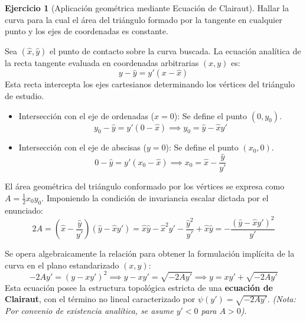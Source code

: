 \documentclass[11pt,a4paper]{article}
\theoremstyle{definition}
\newtheorem{exercise}{Ejercicio}[section]
\theoremstyle{plain}
\begin{document}
\begin{exercise}[Aplicación geométrica mediante Ecuación de Clairaut]
Hallar la curva para la cual el área del triángulo formado por la tangente en cualquier punto y los ejes de coordenadas es constante.
\end{exercise}

\begin{tcolorbox}
Sea $(\hat{x}, \hat{y})$ el punto de contacto sobre la curva buscada. La ecuación analítica de la recta tangente evaluada en coordenadas arbitrarias $(x,y)$ es:
$$ y - \hat{y} = y'(x - \hat{x}) $$
Esta recta intercepta los ejes cartesianos determinando los vértices del triángulo de estudio.
\begin{itemize}
    \item Intersección con el eje de ordenadas ($x=0$): Se define el punto $(0, y_0)$.
    $$ y_0 - \hat{y} = y'(0 - \hat{x}) \implies y_0 = \hat{y} - \hat{x}y' $$
    \item Intersección con el eje de abscisas ($y=0$): Se define el punto $(x_0, 0)$.
    $$ 0 - \hat{y} = y'(x_0 - \hat{x}) \implies x_0 = \hat{x} - \frac{\hat{y}}{y'} $$
\end{itemize}

El área geométrica del triángulo conformado por los vértices se expresa como $A = \frac{1}{2}x_0 y_0$. Imponiendo la condición de invariancia escalar dictada por el enunciado:
$$ 2A = \left( \hat{x} - \frac{\hat{y}}{y'} \right)(\hat{y} - \hat{x}y') = \hat{x}\hat{y} - \hat{x}^2 y' - \frac{\hat{y}^2}{y'} + \hat{x}\hat{y} = -\frac{(\hat{y} - \hat{x}y')^2}{y'} $$

Se opera algebraicamente la relación para obtener la formulación implícita de la curva en el plano estandarizado $(x,y)$:
$$ -2A y' = (y - x y')^2 \implies y - x y' = \sqrt{-2A y'} \implies y = x y' + \sqrt{-2A y'} $$
Esta ecuación posee la estructura topológica estricta de una \textbf{ecuación de Clairaut}, con el término no lineal caracterizado por $\psi(y') = \sqrt{-2A y'}$. \textit{(Nota: Por convenio de existencia analítica, se asume $y' < 0$ para $A>0$).}


\end{tcolorbox}
\end{document}
